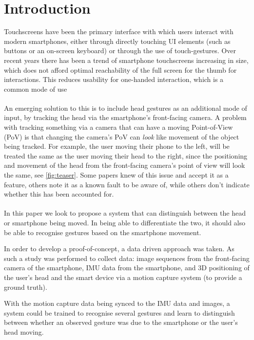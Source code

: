 \section{Introduction}\label{sec:intro} %
Touchscreens have been the primary interface with which users interact with modern smartphones, either through directly touching UI elements (such as buttons or an on-screen keyboard) or through the use of touch-gestures. 
Over recent years there has been a trend of smartphone touchscreens increasing in size\cite{xuesheng2018research}, which does not afford optimal reachability of the full screen for the thumb for interactions\cite{le2018fingers}. This reduces usability for one-handed interaction, which is a common mode of use\cite{hoober2013users}
\\\\
An emerging solution to this is to include head gestures as an additional mode of input, by tracking the head via the smartphone's front-facing camera\cite{gorodnichy2004nouse, deepateep2020facial, voelker2020headreach, roig2015face, hansen2006use, francone2011using}.
A problem with tracking something via a camera that can have a moving Point-of-View (PoV) is that changing the camera's PoV can \textit{look} like movement of the object being tracked.
For example, the user moving their phone to the left, will be treated the same as the user moving their head to the right, since the positioning and movement of the head from the front-facing camera's point of view will look the same, see \autoref{fig:teaser}.
Some papers knew of this issue and accept it as a feature\cite{hansen2006use}, others note it as a known fault to be aware of\cite{francone2011using, varona2008hands}, while others don't indicate whether this has been accounted for\cite{gorodnichy2004nouse, deepateep2020facial, voelker2020headreach,roig2015face}.
\\\\
In this paper we look to propose a system that can distinguish between the head or smartphone being moved. In being able to differentiate the two, it should also be able to recognise gestures based on the smartphone movement.

In order to develop a proof-of-concept, a data driven approach was taken.
As such a study was performed to collect data: image sequences from the front-facing camera of the smartphone, IMU data from the smartphone, and 3D positioning of the user's head and the smart device via a motion capture system (to provide a ground truth).

With the motion capture data being synced to the IMU data and images, a system could be trained to recognise several gestures and learn to distinguish between whether an observed gesture was due to the smartphone or the user's head moving.

